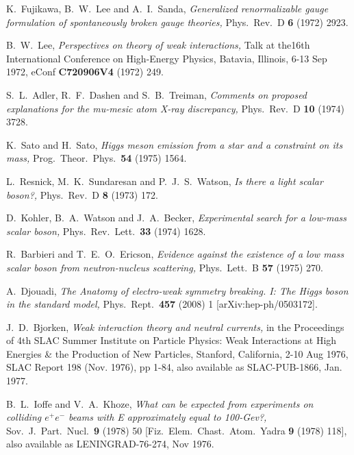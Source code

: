\documentclass[12pt]{article}
\numberwithin{equation}{section}
\begin{document}
\begin{thebibliography}{99}
K.~Fujikawa, B.~W.~Lee and A.~I.~Sanda,
{\it Generalized renormalizable gauge formulation of spontaneously broken gauge theories,}
  Phys.\ Rev.\  D {\bf 6} (1972) 2923.

B.~W.~Lee, {\it Perspectives on theory of weak interactions,} 
Talk at the16th International Conference on High-Energy Physics, Batavia, Illinois, 6-13 Sep 1972,  eConf {\bf C720906V4} (1972) 249.

S.~L.~Adler, R.~F.~Dashen and S.~B.~Treiman,
{\it Comments on proposed explanations for the mu-mesic atom X-ray discrepancy,}
  Phys.\ Rev.\  D {\bf 10} (1974) 3728.
  
K.~Sato and H.~Sato,
{\it Higgs meson emission from a star and a constraint on its mass,}
  Prog.\ Theor.\ Phys.\  {\bf 54} (1975) 1564.

L.~Resnick, M.~K.~Sundaresan and P.~J.~S.~Watson,
{\it Is there a light scalar boson?,}
  Phys.\ Rev.\  D {\bf 8} (1973) 172.

D.~Kohler, B.~A.~Watson and J.~A.~Becker,
{\it Experimental search for a low-mass scalar boson,}
  Phys.\ Rev.\ Lett.\  {\bf 33} (1974) 1628.

R.~Barbieri and T.~E.~O.~Ericson,
{\it Evidence against the existence of a low mass scalar boson from
 neutron-nucleus scattering,}
  Phys.\ Lett.\  B {\bf 57} (1975) 270.
  
A.~Djouadi,
{\it The Anatomy of electro-weak symmetry breaking. I: The Higgs boson in the
standard model,}
  Phys.\ Rept.\  {\bf 457} (2008) 1
  [arXiv:hep-ph/0503172].

J.~D.~Bjorken,
{\it Weak interaction theory and neutral currents,} 
in the Proceedings of 4th SLAC Summer Institute on Particle Physics: Weak Interactions at High Energies \& the Production of New Particles, Stanford, California, 2-10 Aug 1976, SLAC Report 198 (Nov. 1976), pp 1-84, also available as SLAC-PUB-1866, Jan. 1977.

B.~L.~Ioffe and V.~A.~Khoze,
{\it What can be expected from experiments on colliding $e^+ e^-$ beams with E approximately equal to 100-Gev?,}
  Sov.\ J.\ Part.\ Nucl.\  {\bf 9} (1978) 50
  [Fiz.\ Elem.\ Chast.\ Atom.\ Yadra {\bf 9} (1978) 118], also available as LENINGRAD-76-274, Nov 1976.


\end{thebibliography}
\end{document}
